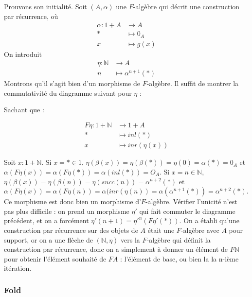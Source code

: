 \documentclass{article}
\newcommand{\N}{\mathbb{N}}
\begin{document}
Prouvons son initialité. Soit $(A, \alpha)$ une $F$-algèbre qui décrit une construction par récurrence, où 
\begin{align*}
    \alpha : 1 + A & \rightarrow A \\ 
    * & \mapsto 0_A \\ 
    x & \mapsto g(x)
\end{align*}
On introduit
\begin{align*}
    \eta : \N & \rightarrow  A \\ 
    n & \mapsto \alpha^{n+1}(*)    
\end{align*} 
Montrons qu'il s'agit bien d'un morphisme de $F$-algèbre. Il suffit de montrer la commutativité du diagramme suivant pour $\eta$ : 
\begin{center}
\end{center}

Sachant que :

\begin{align*}
    F \eta : 1 + \N & \rightarrow 1 + A \\ 
        * & \mapsto inl(*) \\ 
        x & \mapsto inr(\eta(x))  
\end{align*}

Soit $x : 1 + \N$. Si $x = * \in 1$, $ \eta(\beta(x)) = \eta(\beta(*)) = \eta(0) = \alpha(*) = 0_A $ et $ \alpha(F \eta (x)) = \alpha( F \eta (*)) = \alpha(inl(*)) = O_A $. Si $x = n \in \N$, $ \eta(\beta(x)) = \eta(\beta(n)) = \eta(succ(n)) = \alpha^{n+2}(*) $ et $ \alpha( F \eta (x)) = \alpha(F \eta (n)) = \alpha(inr(\eta(n)) = \alpha(\alpha^{n+1}(*)) = \alpha^{n+2}(*) $. Ce morphisme est donc bien un morphisme d'$F$-algèbre. Vérifier l'unicité n'est pas plus difficile : on prend un morphisme $\eta'$ qui fait commuter le diagramme précédent, et on a forcément $\eta'(n+1) = \eta'^n(F\eta'(*)) $. On a établi qu'une construction par récurrence sur des objets de $A$ était une $F$-algèbre avec $A$ pour support, or on a une flèche de $(\N, \eta)$ vers la $F$-algèbre qui définit la construction par récurrence, donc on a simplement à donner un élément de $F\N$ pour obtenir l'élément souhaité de $FA$ : l'élément de base, ou bien la la n-ième itération. 

\subsubsection{Fold}
\end{document}
